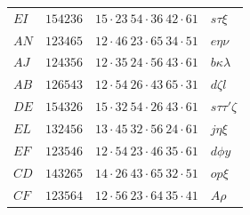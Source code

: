 \documentclass[11pt,a4paper]{article}
\theoremstyle{definition}
\begin{document}
\begin{center}
\begin{tabular}{llll}
$EI$ & $154236$ & $15 \cdot 23\ 54 \cdot 36\ 42 \cdot 61$ & $s\tau\xi$\\
$AN$ & $123465$ & $12 \cdot 46\ 23 \cdot 65\ 34 \cdot 51$ & $e\eta\nu$\\
$AJ$ & $124356$ & $12 \cdot 35\ 24 \cdot 56\ 43 \cdot 61$ & $b\kappa\lambda$\\
$AB$ & $126543$ & $12 \cdot 54\ 26 \cdot 43\ 65 \cdot 31$ & $d\zeta l$\\
$DE$ & $154326$ & $15 \cdot 32\ 54 \cdot 26\ 43 \cdot 61$ & $s\tau\tau'\zeta$\\
$EL$ & $132456$ & $13 \cdot 45\ 32 \cdot 56\ 24 \cdot 61$ & $j\eta\xi$\\
$EF$ & $123546$ & $12 \cdot 54\ 23 \cdot 46\ 35 \cdot 61$ & $d\phi y$\\
$CD$ & $143265$ & $14 \cdot 26\ 43 \cdot 65\ 32 \cdot 51$ & $op\xi$\\
$CF$ & $123564$ & $12 \cdot 56\ 23 \cdot 64\ 35 \cdot 41$ & $A\rho$
\end{tabular}
\end{center}

\newpage
\end{document}
